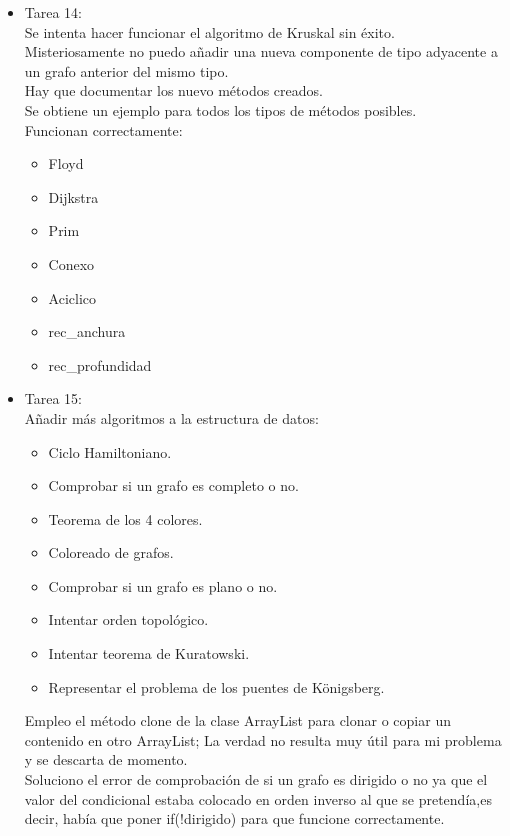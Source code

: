 \begin{itemize}
\item Tarea 14:\\
Se intenta hacer funcionar el algoritmo de Kruskal sin éxito. \\
Misteriosamente no puedo añadir una nueva componente de tipo adyacente a un grafo anterior del mismo tipo.\\
Hay que documentar los nuevo métodos creados.\\
Se obtiene un ejemplo para todos los tipos de métodos posibles. \\
Funcionan correctamente:
\begin{itemize}
\item Floyd
\item Dijkstra
\item Prim
\item Conexo
\item Aciclico
\item rec\_anchura
\item rec\_profundidad
\end{itemize}

\item Tarea 15:\\

Añadir más algoritmos a la estructura de datos:\\

\begin{itemize}
\item Ciclo Hamiltoniano.
\item Comprobar si un grafo es completo o no.
\item Teorema de los 4 colores.
\item Coloreado de grafos.
\item Comprobar si un grafo es plano o no.
\item Intentar orden topológico.
\item Intentar teorema de Kuratowski.
\item Representar el problema de los puentes de Königsberg.
\end{itemize}

Empleo el método clone de la clase ArrayList para clonar o copiar un contenido en otro ArrayList; La verdad no resulta muy útil para mi problema y se descarta de momento.\\

Soluciono el error de comprobación de si un grafo es dirigido o no ya que el valor del condicional estaba colocado en orden inverso al que se pretendía,es decir, había que poner if(!dirigido) para que funcione correctamente.\\


\end{itemize}
